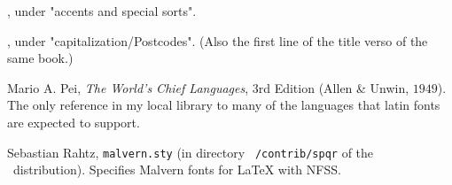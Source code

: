 	\Ibid, under "accents and special sorts".

	\Ibid, under "capitalization/Postcodes".  (Also the first line
	of the title verso of the same book.)

	Mario A. Pei, {\it The World's Chief Languages}, $3$rd Edition
	(Allen \& Unwin, $1949$).  The only reference in my local
	library to many of the languages that latin fonts are expected
	to support.

	Sebastian Rahtz, {\tt malvern.sty} (in directory {\tt
	/contrib/spqr} of the \package\ distribution).  Specifies
	Malvern fonts for \LaTeX {} with NFSS.
\par
\endgroup 

